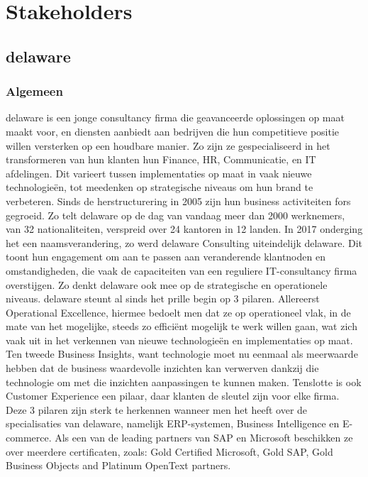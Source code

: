 
\chapter{Stakeholders}
\label{ch:conclusie}


\section{delaware}
\subsection{Algemeen}
delaware is een jonge consultancy firma die geavanceerde oplossingen op maat maakt voor, en diensten aanbiedt aan bedrijven die hun competitieve positie willen versterken op een houdbare manier. Zo zijn ze gespecialiseerd in het transformeren van hun klanten hun Finance, HR, Communicatie, en IT afdelingen. Dit varieert tussen implementaties op maat in vaak nieuwe technologieën, tot meedenken op strategische niveaus om hun brand te verbeteren. 
Sinds de herstructurering in 2005 zijn hun business activiteiten fors gegroeid. Zo telt delaware op de dag van vandaag meer dan 2000 werknemers, van 32 nationaliteiten, verspreid over 24 kantoren in 12 landen. In 2017 onderging het een naamsverandering, zo werd delaware Consulting uiteindelijk delaware. Dit toont hun engagement om aan te passen aan veranderende klantnoden en omstandigheden, die vaak de capaciteiten van een reguliere IT-consultancy firma overstijgen. Zo denkt delaware ook mee op de strategische en operationele niveaus.  
delaware steunt al sinds het prille begin op 3 pilaren. Allereerst Operational Excellence, hiermee bedoelt men dat ze op operationeel vlak, in de mate van het mogelijke, steeds zo efficiënt mogelijk te werk willen gaan, wat zich vaak uit in het verkennen van nieuwe technologieën en implementaties op maat. Ten tweede Business Insights, want technologie moet nu eenmaal als meerwaarde hebben dat de business waardevolle inzichten kan verwerven dankzij die technologie om met die inzichten aanpassingen te kunnen maken. Tenslotte is ook Customer Experience een pilaar, daar klanten de sleutel zijn voor elke firma. Deze 3 pilaren zijn sterk te herkennen wanneer men het heeft over de specialisaties van delaware, namelijk ERP-systemen, Business Intelligence en E-commerce. 
Als een van de leading partners van SAP en Microsoft beschikken ze over meerdere certificaten, zoals: Gold Certified Microsoft, Gold SAP, Gold Business Objects and Platinum OpenText partners.

